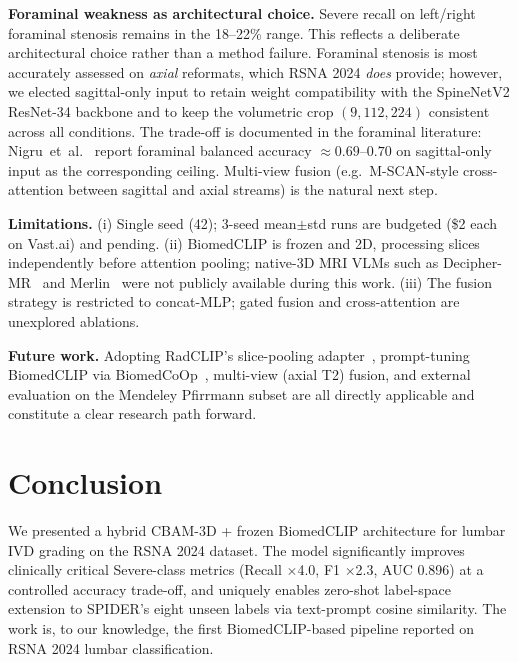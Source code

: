\documentclass[conference]{IEEEtran}
\begin{document}
\textbf{Foraminal weakness as architectural choice.} Severe recall on
left/right foraminal stenosis remains in the 18--22\% range. This
reflects a deliberate architectural choice rather than a method
failure. Foraminal stenosis is most accurately assessed on
\emph{axial} reformats, which RSNA 2024 \emph{does} provide; however,
we elected sagittal-only input to retain weight compatibility with
the SpineNetV2 ResNet-34 backbone and to keep the volumetric crop
$(9, 112, 224)$ consistent across all conditions. The trade-off is
documented in the foraminal literature: Nigru~et~al.~\cite{nigru2024}
report foraminal balanced accuracy $\approx 0.69$--$0.70$ on
sagittal-only input as the corresponding ceiling. Multi-view fusion
(e.g.\ M-SCAN-style cross-attention between sagittal and axial
streams) is the natural next step.

\textbf{Limitations.} (i) Single seed (42); 3-seed mean$\pm$std runs
are budgeted (\$2 each on Vast.ai) and pending. (ii) BiomedCLIP is
frozen and 2D, processing slices independently before
attention pooling; native-3D MRI VLMs such as
Decipher-MR~\cite{yang2026deciphermr} and Merlin~\cite{blankemeier2026merlin}
were not publicly available during this work. (iii) The fusion strategy
is restricted to concat-MLP; gated fusion and cross-attention are
unexplored ablations.

\textbf{Future work.} Adopting RadCLIP's slice-pooling
adapter~\cite{lu2024radclip}, prompt-tuning BiomedCLIP via
BiomedCoOp~\cite{koleilat2025biomedcoop}, multi-view (axial T2)
fusion, and external evaluation on the Mendeley Pfirrmann subset are
all directly applicable and constitute a clear research path forward.

\section{Conclusion}
\label{sec:concl}

We presented a hybrid CBAM-3D + frozen BiomedCLIP architecture for
lumbar IVD grading on the RSNA 2024 dataset. The model significantly
improves clinically critical Severe-class metrics (Recall
$\times$4.0, F1 $\times$2.3, AUC 0.896) at a controlled accuracy
trade-off, and uniquely enables zero-shot label-space extension to
SPIDER's eight unseen labels via text-prompt cosine similarity. The
work is, to our knowledge, the first BiomedCLIP-based pipeline
reported on RSNA 2024 lumbar classification.
\end{document}
